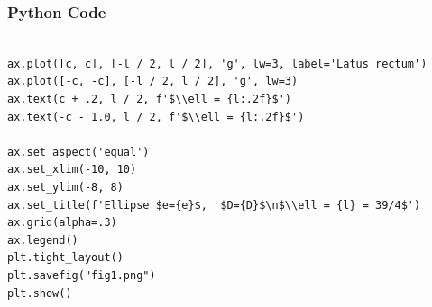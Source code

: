 \documentclass{beamer}
\numberwithin{equation}{section}
\begin{document}
\begin{frame}[fragile]
    \frametitle{Python Code}
    \begin{lstlisting}

ax.plot([c, c], [-l / 2, l / 2], 'g', lw=3, label='Latus rectum')
ax.plot([-c, -c], [-l / 2, l / 2], 'g', lw=3)
ax.text(c + .2, l / 2, f'$\\ell = {l:.2f}$')
ax.text(-c - 1.0, l / 2, f'$\\ell = {l:.2f}$')

ax.set_aspect('equal')
ax.set_xlim(-10, 10)
ax.set_ylim(-8, 8)
ax.set_title(f'Ellipse $e={e}$,  $D={D}$\n$\\ell = {l} = 39/4$')
ax.grid(alpha=.3)
ax.legend()
plt.tight_layout()
plt.savefig("fig1.png")
plt.show()

\end{lstlisting}
\end{frame}
\end{document}
